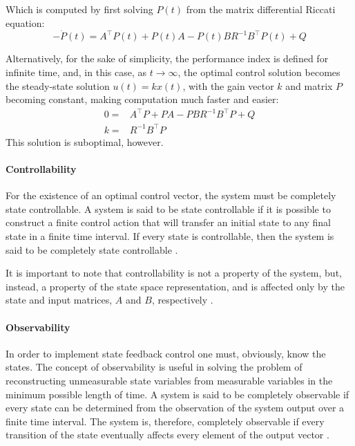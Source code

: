 \documentclass[  10pt, twoside]{report} %
\numberwithin{equation}{chapter}
\begin{document}
Which is computed by first solving $P(t)$ from the matrix differential Riccati equation:
\begin{equation}
    -\dot{P}(t) = A^\intercal P(t) + P(t) A - P(t) B R^{-1} B^\intercal P(t) + Q
\end{equation}

Alternatively, for the sake of simplicity, the performance index is defined for infinite time, and, in this case, as $t \rightarrow \infty$, the optimal control solution becomes the steady-state solution $u(t)= k x(t)$, with the gain vector $k$ and matrix $P$ becoming constant, making computation much faster and easier:
\begin{align}
    0 =& A^\intercal P + P A - P B R^{-1} B^\intercal P + Q \\
    k =& R^{-1} B^\intercal P
\end{align}
This solution is suboptimal, however.

\paragraph{Controllability}
For the existence of an optimal control vector, the system must be completely state controllable. A system is said to be state controllable if it is possible to construct a finite control action that will transfer an initial state to any final state in a finite time interval. If every state is controllable, then the system is said to be completely state controllable \citep{Sa_da_Costa}. 

It is important to note that controllability is not a property of the system, but, instead, a property of the state space representation, and is affected only by the state and input matrices, $A$ and $B$, respectively \citep{Botto}.

\paragraph{Observability}
In order to implement state feedback control one must, obviously, know the states. The concept of observability is useful in solving the problem of reconstructing unmeasurable state variables from measurable variables in the minimum possible length of time. A system is said to be completely observable if every state can be determined from the observation of the system output over a finite time interval. The system is, therefore, completely observable if every transition of the state eventually affects every element of the output vector \citep{Sa_da_Costa}.
\end{document}
